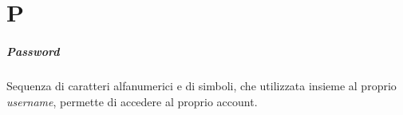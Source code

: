 \chapter{P}

\paragraph*{Password}
Sequenza di caratteri alfanumerici e di simboli, che utilizzata insieme al proprio \textit{username}, permette di accedere al proprio account.